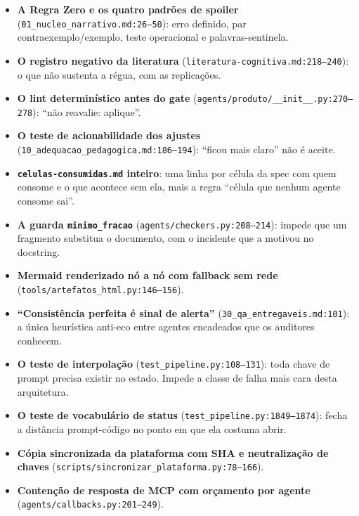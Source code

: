 \documentclass[11pt,a4paper]{article}
\begin{document}
\begin{itemize}
  \item \textbf{A Regra Zero e os quatro padrões de spoiler} (\texttt{01\_nucleo\_narrativo.md:26--50}):
        erro definido, par contraexemplo/exemplo, teste operacional e palavras-sentinela.
  \item \textbf{O registro negativo da literatura} (\texttt{literatura-cognitiva.md:218--240}): o que
        não sustenta a régua, com as replicações.
  \item \textbf{O lint determinístico antes do gate} (\texttt{agents/produto/\_\_init\_\_.py:270--278}):
        ``não reavalie: aplique''.
  \item \textbf{O teste de acionabilidade dos ajustes} (\texttt{10\_adequacao\_pedagogica.md:186--194}):
        ``ficou mais claro'' não é aceite.
  \item \textbf{\texttt{celulas-consumidas.md} inteiro}: uma linha por célula da spec com quem consome
        e o que acontece sem ela, mais a regra ``célula que nenhum agente consome sai''.
  \item \textbf{A guarda \texttt{minimo\_fracao}} (\texttt{agents/checkers.py:208--214}): impede que um
        fragmento substitua o documento, com o incidente que a motivou no docstring.
  \item \textbf{Mermaid renderizado nó a nó com fallback sem rede}
        (\texttt{tools/artefatos\_html.py:146--156}).
  \item \textbf{``Consistência perfeita é sinal de alerta''} (\texttt{30\_qa\_entregaveis.md:101}): a
        única heurística anti-eco entre agentes encadeados que os auditores conhecem.
  \item \textbf{O teste de interpolação} (\texttt{test\_pipeline.py:108--131}): toda chave de prompt
        precisa existir no estado. Impede a classe de falha mais cara desta arquitetura.
  \item \textbf{O teste de vocabulário de status} (\texttt{test\_pipeline.py:1849--1874}): fecha a
        distância prompt-código no ponto em que ela costuma abrir.
  \item \textbf{Cópia sincronizada da plataforma com SHA e neutralização de chaves}
        (\texttt{scripts/sincronizar\_plataforma.py:78--166}).
  \item \textbf{Contenção de resposta de MCP com orçamento por agente}
        (\texttt{agents/callbacks.py:201--249}).
\end{itemize}

\end{document}
